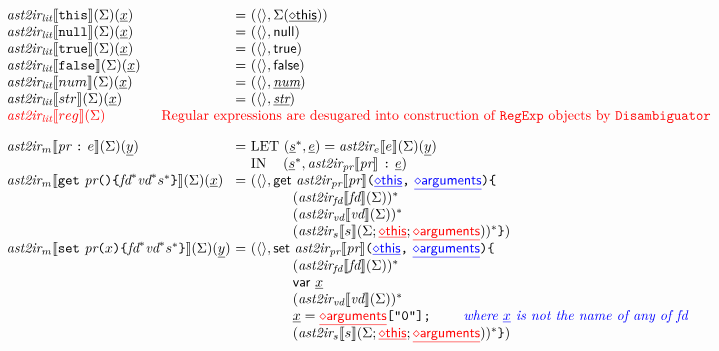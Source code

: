 \[\begin{array}{l@{~}l@{~}l}
\atoiLITfd {{\tt this}}(\ir{x})
&=&
(\emptyenv, \env(\newvar{this}))\\

\atoiLITfd{{\tt null}}(\ir{x})
&=& 
(\emptyenv, {\sf null})\\
\atoiLITfd{{\tt true}}(\ir{x})
&=& 
(\emptyenv, {\sf true})\\
\atoiLITfd{{\tt false}}(\ir{x})
&=& 
(\emptyenv, {\sf false})\\
\atoiLITfd{num}(\ir{x})
&=& 
(\emptyenv, \ir\num)\\

\atoiLITfd {str}(\ir{x})
&=& 
(\emptyenv, \ir\str)\\

\inred\atoiLITfd { reg }
\lefteqn{
\qquad\qquad
\mbox{\inred Regular expressions are desugared into construction of {\tt RegExp} objects by {\tt Disambiguator}}}

\\[1em]
\atoiM\lbr {\prop \ \verb+:+ \ \expr}  \rbr(\env)(\ir{y})
&=& \mbox{LET\ } (\irstmt^*, \irexpr) = \atoiEfd{\expr}(\ir{y})\\
& & \mbox{IN}\hspace*{1.2em}
(\irstmt^*, \atoiPRfd{\prop} \ \verb+:+ \ \irexpr)
\\


\atoiM\lbr {\tt get} \ \prop \verb+(){+ \fd^* \vd^* \stmt^* \verb+}+  \rbr(\env)(\ir{x})
&=& (
\langle\rangle,

{\sf get} \ \atoiPRfd{\prop} \verb+(+{\inblue\newvar{this}}\verb+,+\ {\inblue\newvar{arguments}}\verb+)+
\verb+{+\\
&&\quad\quad\quad(\atoiFDfd{\fd})^*\\
&&\quad\quad\quad(\atoiVDf{\vd}\env)^*\\
&&\quad\quad\quad(\atoiSf{\stmt}{\env; {\inred\newvar{this}}; {\inred\newvar{arguments}}})^*
\verb+}+
)
\\

\atoiM\lbr {\tt set} \ \prop \verb+(+x \verb+){+ \fd^* \vd^* \stmt^* \verb+}+  \rbr(\env)(\ir{y})
&=& (
\langle\rangle,

{\sf set} \ \atoiPRfd{\prop} \verb+(+{\inblue\newvar{this}}\verb+,+\ {\inblue\newvar{arguments}}\verb+)+
\verb+{+\\
&&\quad\quad\quad(\atoiFDfd{\fd})^*\\
&&\quad\quad\quad{\sf var}\ \ir{x}\\
&&\quad\quad\quad(\atoiVDf{\vd}\env)^*\\
&&\quad\quad\quad
\ir{x} = {\inred\newvar{arguments}}\verb+["0"];+
\quad\note{where \ir{x} is not the name of any of \mbox{fd}}\\
&&\quad\quad\quad(\atoiSf{\stmt}{\env; {\inred\newvar{this}}; {\inred\newvar{arguments}}})^*
\verb+}+
)
\end{array}
\]
